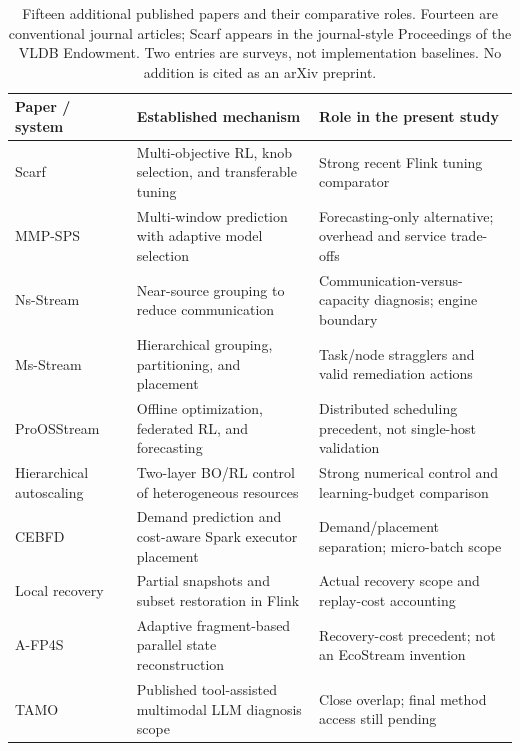 \begin{table}[t]
\caption{Fifteen additional published papers and their comparative roles. Fourteen are conventional journal articles; Scarf appears in the journal-style Proceedings of the VLDB Endowment. Two entries are surveys, not implementation baselines. No addition is cited as an arXiv preprint.}
\label{tab:additional-related-work}
\centering
\footnotesize
\setlength{\tabcolsep}{5pt}
\renewcommand{\arraystretch}{1.13}
\begin{tabularx}{\textwidth}{@{}p{} >{\raggedright\arraybackslash}X >{\raggedright\arraybackslash}X@{}}
\toprule
\textbf{Paper / system} & \textbf{Established mechanism} & \textbf{Role in the present study} \\
\midrule
Scarf~\cite{liu2026scarf} & Multi-objective RL, knob selection, and transferable tuning & Strong recent Flink tuning comparator \\
MMP-SPS~\cite{wladdimiro2026mmpsps} & Multi-window prediction with adaptive model selection & Forecasting-only alternative; overhead and service trade-offs \\
Ns-Stream~\cite{wu2025nsstream} & Near-source grouping to reduce communication & Communication-versus-capacity diagnosis; engine boundary \\
Ms-Stream~\cite{wu2025msstream} & Hierarchical grouping, partitioning, and placement & Task/node stragglers and valid remediation actions \\
ProOSStream~\cite{lajili2026proosstream} & Offline optimization, federated RL, and forecasting & Distributed scheduling precedent, not single-host validation \\
Hierarchical autoscaling~\cite{russorusso2023hierarchical} & Two-layer BO/RL control of heterogeneous resources & Strong numerical control and learning-budget comparison \\
CEBFD~\cite{li2024cebfd} & Demand prediction and cost-aware Spark executor placement & Demand/placement separation; micro-batch scope \\
Local recovery~\cite{takdir2025localrecovery} & Partial snapshots and subset restoration in Flink & Actual recovery scope and replay-cost accounting \\
A-FP4S~\cite{xu2023afp4s} & Adaptive fragment-based parallel state reconstruction & Recovery-cost precedent; not an EcoStream invention \\
TAMO~\cite{zhang2025tamo} & Published tool-assisted multimodal LLM diagnosis scope & Close overlap; final method access still pending \\

\end{tabularx}
\end{table}

